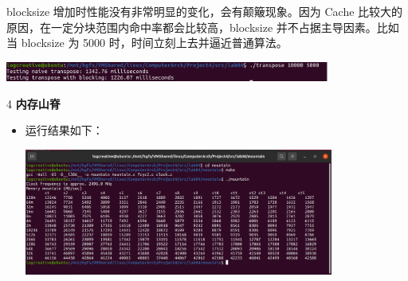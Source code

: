 \documentclass[12pt,a4paper]{article}
\newenvironment{problems}{\begin{list}{}{\renewcommand{\makelabel}[1]{\textbf{##1}.\hfil}}}{\end{list}}
\newenvironment{steps}{\begin{list}{}{\renewcommand{\makelabel}[1]{(##1)\hfil}}}{\end{list}}
\begin{document}
\begin{problems}
\begin{steps}
        blocksize 增加时性能没有非常明显的变化，会有颠簸现象。因为 Cache 比较大的原因，在一定分块范围内命中率都会比较高，blocksize 并不占据主导因素。比如当 blocksize 为 5000 时，时间立刻上去并逼近普通算法。

        \includegraphics[width=0.8\textwidth]{biggerblock.png}

    \end{steps}
    \clearpage
    \item[4] \textbf{内存山脊}
    
    \begin{itemize}
        \item 运行结果如下：
        
        \includegraphics[width=0.8\textwidth]{mountain.png}


\end{itemize}
\end{problems}
\end{document}
